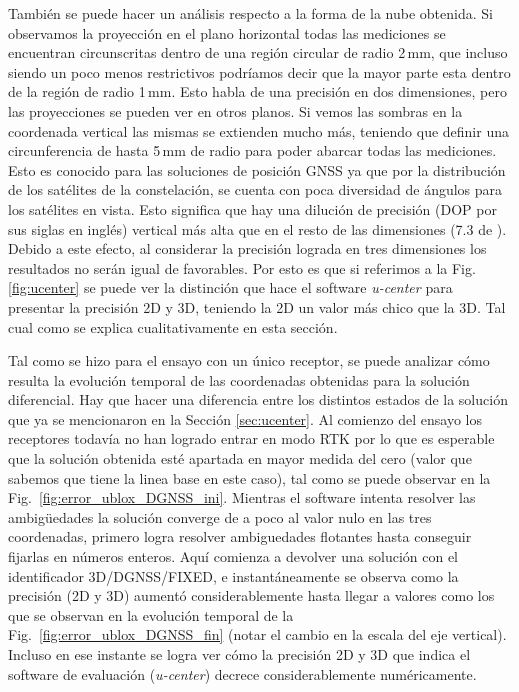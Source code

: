 \documentclass[a4paper,12pt,oneside,onecolumn,final,openright]{book}%
\begin{document}
	También se puede hacer un análisis respecto a la forma de la nube obtenida. Si observamos la proyección en el plano horizontal todas las mediciones se encuentran circunscritas dentro de una región circular de radio 2\,mm, que incluso siendo un poco menos restrictivos podríamos decir que la mayor parte esta dentro de la región de radio 1\,mm. Esto habla de una precisión en dos dimensiones, pero las proyecciones se pueden ver en otros planos. Si vemos las sombras en la coordenada vertical las mismas se extienden mucho más, teniendo que definir una circunferencia de hasta 5\,mm de radio para poder abarcar todas las mediciones. Esto es conocido para las soluciones de posición GNSS ya que por la distribución de los satélites de la constelación, se cuenta con poca diversidad de ángulos para los satélites en vista. Esto significa que hay una dilución de precisión (DOP por sus siglas en inglés) vertical más alta que en el resto de las dimensiones (7.3 de \cite{kaplan}). Debido a este efecto, al considerar la precisión lograda en tres dimensiones los resultados no serán igual de favorables. Por esto es que si referimos a la Fig. \ref{fig:ucenter} se puede ver la distinción que hace el software \textit{u-center} para presentar la precisión 2D y 3D, teniendo la 2D un valor más chico que la 3D. Tal cual como se explica cualitativamente en esta sección.
	
	Tal como se hizo para el ensayo con un único receptor, se puede analizar cómo resulta la evolución temporal de las coordenadas obtenidas para la solución diferencial. Hay que hacer una diferencia entre los distintos estados de la solución que ya se mencionaron en la Sección \ref{sec:ucenter}. Al comienzo del ensayo los receptores todavía no han logrado entrar en modo RTK por lo que es esperable que la solución obtenida esté apartada en mayor medida del cero (valor que sabemos que tiene la linea base en este caso), tal como se puede observar en la Fig.~\ref{fig:error_ublox_DGNSS_ini}. Mientras el software intenta resolver las ambigüedades la solución converge de a poco al valor nulo en las tres coordenadas, primero logra resolver ambiguedades flotantes hasta conseguir fijarlas en números enteros. Aquí comienza a devolver una solución con el identificador 3D/DGNSS/FIXED, e instantáneamente se observa como la precisión (2D y 3D) aumentó considerablemente hasta llegar a valores como los que se observan en la evolución temporal de la Fig.~\ref{fig:error_ublox_DGNSS_fin} (notar el cambio en la escala del eje vertical). Incluso en ese instante se logra ver cómo la precisión 2D y 3D que indica el software de evaluación (\textit{u-center}) decrece considerablemente numéricamente.
	
\end{document}
